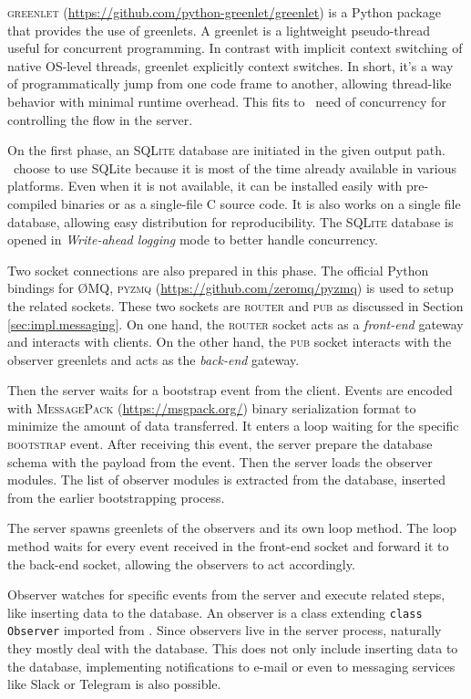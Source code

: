 \textsc{greenlet} (\url{https://github.com/python-greenlet/greenlet}) is a Python package that provides the use of greenlets.
A greenlet is a lightweight pseudo-thread useful for concurrent programming.
In contrast with implicit context switching of native OS-level threads, greenlet explicitly context switches.
In short, it's a way of programmatically jump from one code frame to another, allowing thread-like behavior with minimal runtime overhead.
This fits to \firstposs~need of concurrency for controlling the flow in the server.

On the first phase, an \textsc{SQLite} database are initiated in the given output path.
\First~choose to use SQLite because it is most of the time already available in various platforms.
Even when it is not available, it can be installed easily with pre-compiled binaries or as a single-file C source code.
It is also works on a single file database, allowing easy distribution for reproducibility.
The \textsc{SQLite} database is opened in \emph{Write-ahead logging} mode to better handle concurrency.

Two socket connections are also prepared in this phase.
The official Python bindings for \O MQ, \textsc{pyzmq} (\url{https://github.com/zeromq/pyzmq}) is used to setup the related sockets.
These two sockets are \textsc{router} and \textsc{pub} as discussed in Section \ref{sec:impl.messaging}.
On one hand, the \textsc{router} socket acts as a \emph{front-end} gateway and interacts with clients.
On the other hand, the \textsc{pub} socket interacts with the observer greenlets and acts as the \emph{back-end} gateway.

Then the server waits for a bootstrap event from the client.
Events are encoded with \textsc{MessagePack} (\url{https://msgpack.org/}) binary serialization format to minimize the amount of data transferred.
It enters a loop waiting for the specific \textsc{bootstrap} event.
After receiving this event, the server prepare the database schema with the payload from the event.
Then the server loads the observer modules.
The list of observer modules is extracted from the database, inserted from the earlier bootstrapping process.

The server spawns greenlets of the observers and its own loop method.
The loop method waits for every event received in the front-end socket and forward it to the back-end socket, allowing the observers to act accordingly.

Observer watches for specific events from the server and execute related steps, like inserting data to the database.
An observer is a class extending \texttt{class Observer} imported from .
Since observers live in the server process, naturally they mostly deal with the database.
This does not only include inserting data to the database, implementing notifications to e-mail or even to messaging services like Slack or Telegram is also possible.

